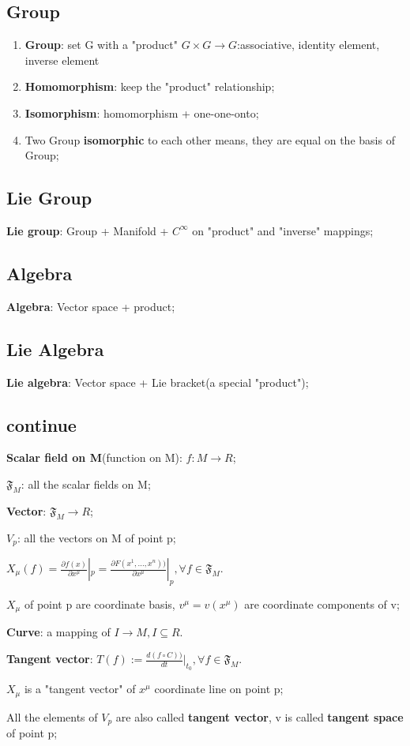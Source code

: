 \documentclass[12pt]{article}
\numberwithin{equation}{section}
\begin{document}
\subsection{Group}
	\begin{enumerate}
	\item \textbf{Group}: set G with a "product" $G\times G\rightarrow G$:associative, identity element, inverse element
	\item \textbf{Homomorphism}: keep the "product" relationship;
	\item \textbf{Isomorphism}: homomorphism + one-one-onto;
	\item Two Group \textbf{isomorphic} to each other means, they are equal on the basis of Group;
	\end{enumerate}
\subsection{Lie Group}
	\textbf{Lie group}: Group + Manifold + $C^\infty$ on "product" and "inverse" mappings;
\subsection{Algebra}
	\textbf{Algebra}: Vector space + product;
\subsection{Lie Algebra}
	\textbf{Lie algebra}: Vector space + Lie bracket(a special "product");	
\subsection{continue}
	\textbf{Scalar field on M}(function on M): $f:M \rightarrow R$; \par
	$\mathfrak{F}_M$: all the scalar fields on M; \par
	\textbf{Vector}: $\mathfrak{F}_M\rightarrow R$; \par
	$V_p$: all the vectors on M of point p; \par
	$X_\mu(f)=\frac{\partial f(x)}{\partial x^\mu}|_p = \frac{\partial F(x^1,...,x^n))}{\partial x^\mu}|_p, \forall f \in \mathfrak{F}_M$. \par
	${X_\mu}$ of point p are coordinate basis, $v^\mu=v(x^\mu)$ are coordinate components of v;\par
	\textbf{Curve}: a mapping of $I\rightarrow M, I\subseteq R$.\par
	\textbf{Tangent vector}: $T(f):=\frac{d(f\circ C))}{dt}|_{t_0}, \forall f \in \mathfrak{F}_M$.\par
	$X_\mu$ is a "tangent vector" of $x^\mu$ coordinate line on point p;\par
	All the elements of $V_p$ are also called \textbf{tangent vector}, v is called \textbf{tangent space} of point p;
\end{document}
